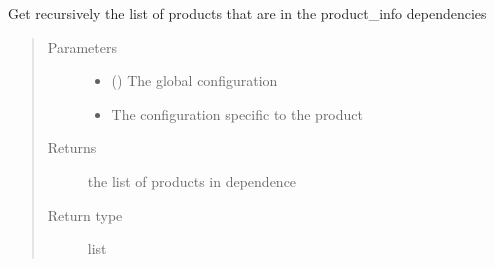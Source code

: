 \documentclass[a4paper,10pt,english]{sphinxmanual}
\begin{document}
\begin{fulllineitems}
\label{\detokenize{commands/apidoc/src:src.product.get_product_dependencies}}
Get recursively the list of products that are 
in the product\_info dependencies
\begin{quote}\begin{description}
\item[{Parameters}] \leavevmode\begin{itemize}
\item {} 
 () \textendash{} The global configuration

\item {} 
 \textendash{} The configuration specific to 
the product

\end{itemize}

\item[{Returns}] \leavevmode
the list of products in dependence

\item[{Return type}] \leavevmode
list

\end{description}\end{quote}

\end{fulllineitems}

\end{document}
